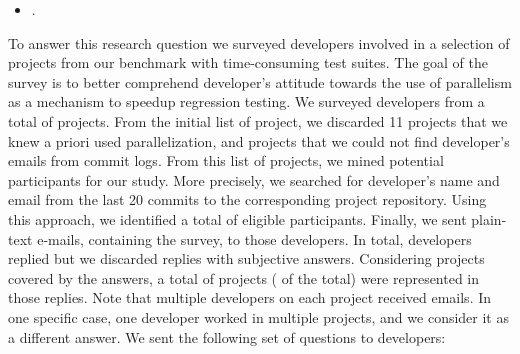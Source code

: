 \begin{itemize}
  \item \numRQAdoptionTwo{}. \textbf{\RQAdoptionTwo{}}
\end{itemize}

To answer this research question we surveyed developers involved in a
selection of projects from our benchmark with time-consuming test
suites.  The goal of the survey is to better comprehend developer's
attitude towards the use of parallelism as a mechanism to speedup
regression testing.  We surveyed developers from a total of
\emailsProjects{} projects.  From the initial list of \numMedLong{}
project, we discarded 11 projects that we knew a priori used
parallelization, and \discartedProjects{} projects that we could not find
developer's emails from commit logs.  From this list of projects, we
mined potential participants for our study.  More precisely, we
searched for developer's name and email from the last 20 commits to
the corresponding project repository.  Using this approach, we
identified a total of \emailsSent{} eligible participants.  Finally,
we sent plain-text e-mails, containing the survey, to those developers.  In
total, \emailsAnswered{} developers replied but we discarded
\emailsFalseAnswers{} replies with subjective answers.  Considering
projects covered by the answers, a total of \emailsProjectsAnswered{}
projects (\percEmailsProjectsAnswered{} of the total) were represented
in those replies. Note that multiple developers on each project
received emails. In one specific case, one developer worked in
  multiple projects, and we consider it as a different answer. We sent the following set of questions to
developers:

